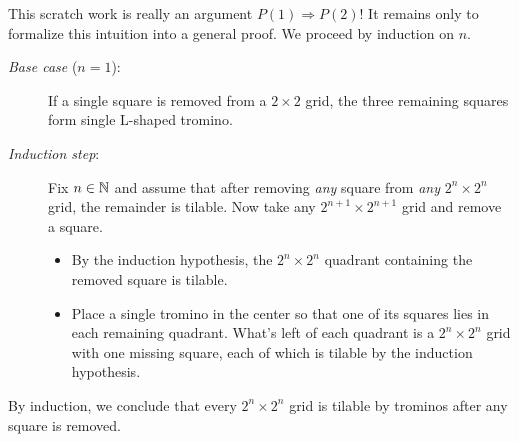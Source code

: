 \begin{example}{}{}
	This scratch work is really an argument $P(1)\Longrightarrow P(2)$! It remains only to formalize this intuition into a general proof. We proceed by induction on $n$.
	\begin{description}
		\item[\normalfont\emph{Base case} ($n=1$):] If a single square is removed from a $2\times 2$ grid, the three remaining squares form single L-shaped tromino.
		\item[\normalfont\emph{Induction step}:] Fix $n\in\mathbb{N}$ and assume that after removing \emph{any} square from \emph{any} $2^n\times 2^n$ grid, the remainder is tilable. Now take any $2^{n+1}\times 2^{n+1}$ grid and remove a square.
	\begin{itemize}
	  \item By the induction hypothesis, the $2^n\times 2^n$ quadrant containing the removed square is tilable.
	  \item Place a single tromino in the center so that one of its squares lies in each remaining quadrant. What's left of each quadrant is a $2^n\times 2^n$ grid with one missing square, each of which is tilable by the induction hypothesis.
	\end{itemize}  
	\end{description}
	By induction, we conclude that every $2^n\times 2^n$ grid is tilable by trominos after any square is removed.
\end{example}


\goodbreak

